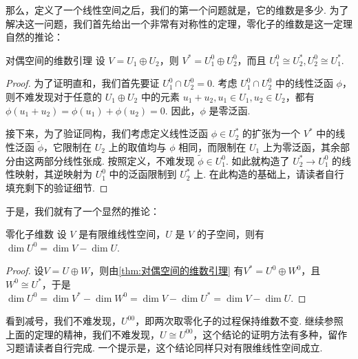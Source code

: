 那么，定义了一个线性空间之后，我们的第一个问题就是，它的维数是多少. 为了解决这一问题，我们首先给出一个非常有对称性的定理，零化子的维数是这一定理自然的推论：


\begin{theorem}{}{对偶空间的维数引理}
    设 $V = U_1 \oplus U_2$，则 $V^* = U_1^0 \oplus U_2^0$，而且 $U_1^0 \cong U_2^*, U_2^0 \cong U_1^*$.
\end{theorem}


\begin{proof}
    为了证明直和，我们首先要证 $U_1^0 \cap U_2^0 = 0$. 考虑 $U_1^0 \cap U_2^0$ 中的线性泛函 $\phi$，则不难发现对于任意的 $U_1 \oplus U_2$ 中的元素 $u_1 + u_2, u_1 \in U_1, u_2 \in U_2$，都有 $\phi(u_1 + u_2) = \phi(u_1) + \phi(u_2) = 0$. 因此，$\phi$ 是零泛函.

    接下来，为了验证同构，我们考虑定义线性泛函 $\phi \in U_2^*$ 的扩张为一个 $V^*$ 中的线性泛函 $\tilde{\phi}$，它限制在 $U_2$ 上的取值均与 $\phi$ 相同，而限制在 $U_1$ 上为零泛函，其余部分由这两部分线性张成. 按照定义，不难发现 $\tilde \phi \in U_1^0$. 如此就构造了 $U_2^* \to U_1^0$ 的线性映射，其逆映射为 $U_1^0$ 中的泛函限制到 $U_2^*$ 上. 在此构造的基础上，请读者自行填充剩下的验证细节.
\end{proof}

于是，我们就有了一个显然的推论：

\begin{theorem}{}{零化子维数}
    设 $V$ 是有限维线性空间，$U$ 是 $V$ 的子空间，则有 $\dim U^0 = \dim V - \dim U$.
\end{theorem}
\begin{proof}
    设$V=U\oplus W$，则由\autoref{thm:对偶空间的维数引理} 有$V^*=U^0\oplus W^0$，且$W^0 \cong U^*$，于是$\dim U^0=\dim V^*-\dim W^0=\dim V-\dim U^*=\dim V-\dim U$.
\end{proof}

看到减号，我们不难发现，$U^{00}$，即两次取零化子的过程保持维数不变. 继续参照上面的定理的精神，我们不难发现，$U \cong U^{00}$，这个结论的证明方法有多种，留作习题请读者自行完成. 一个提示是，这个结论同样只对有限维线性空间成立.

